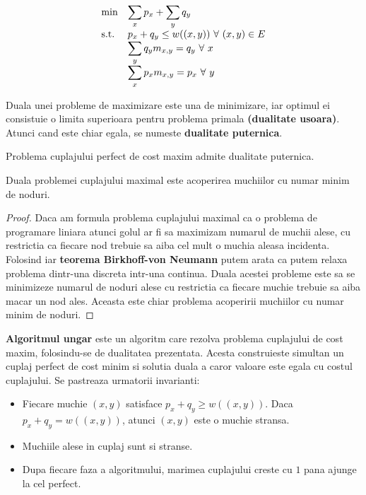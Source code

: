 \begin{equation*}
\begin{array}{ll@{}ll}
  \text{min}  & \displaystyle\sum\limits_{x} p_{x} + \displaystyle\sum\limits_{y} q_{y} &\\
  \text{s.t.} & p_{x} + q_{y} \leq w((x, y)) \ \forall \ (x, y) \in E &\\
              & \displaystyle\sum\limits_{y} q_{y} m_{x, y} = q_{y} \ \forall \ x &\\
              & \displaystyle\sum\limits_{x} p_{x} m_{x, y} = p_{x} \ \forall \ y &\\
\end{array}
\end{equation*}

Duala unei probleme de maximizare este una de minimizare, iar optimul ei consistuie o limita superioara pentru problema primala
\textbf{(dualitate usoara)}. Atunci cand este chiar egala, se numeste \textbf{dualitate puternica}.

\begin{thm}
  Problema cuplajului perfect de cost maxim admite dualitate puternica.
\end{thm}

\begin{thm}
  Duala problemei cuplajului maximal este acoperirea muchiilor cu numar minim de noduri.
\end{thm}

\begin{proof}
  Daca am formula problema cuplajului maximal ca o problema de programare liniara atunci golul ar fi sa maximizam numarul de muchii alese,
  cu restrictia ca fiecare nod trebuie sa aiba cel mult o muchia aleasa incidenta. Folosind iar \textbf{teorema Birkhoff-von Neumann} putem
  arata ca putem relaxa problema dintr-una discreta intr-una continua. Duala acestei probleme este sa se minimizeze numarul de noduri alese
  cu restrictia ca fiecare muchie trebuie sa aiba macar un nod ales. Aceasta este chiar problema acoperirii muchiilor cu numar minim de noduri.
\end{proof}

\textbf{Algoritmul ungar} este un algoritm care rezolva problema cuplajului de cost maxim, folosindu-se de dualitatea prezentata. Acesta
construieste simultan un cuplaj perfect de cost minim si solutia duala a caror valoare este egala cu costul cuplajului. Se pastreaza
urmatorii invarianti:

\begin{itemize}
  \item Fiecare muchie $(x, y)$ satisface $p_{x} + q_{y} \geq w((x, y))$. Daca $p_{x} + q_{y} = w((x, y))$, atunci $(x, y)$ este o muchie stransa.
  \item Muchiile alese in cuplaj sunt si stranse.
  \item Dupa fiecare faza a algoritmului, marimea cuplajului creste cu $1$ pana ajunge la cel perfect.
\end{itemize}

